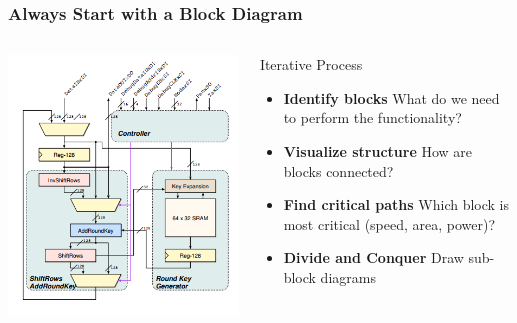 \documentclass[compress]{beamer}
\begin{document}
\begin{frame}
	\frametitle{Always Start with a Block Diagram}
	\begin{columns}
		\begin{center}
			\includegraphics[width= \textwidth]{block_micro_arc}
		\end{center}	
		\begin{block}{Iterative Process}
			\begin{itemize}
				\item \textbf {Identify blocks} \newline
				What do we need to perform the functionality?
				\pause
				\item \textbf {Visualize structure} \newline
				How are blocks connected?
				\pause
				\item \textbf {Find critical paths} \newline
				Which block is most critical (speed, area, power)?
				\pause
				\item \textbf {Divide and Conquer} \newline
				Draw sub-block diagrams
			\end{itemize}
		\end{block}
	\end{columns}
\end{frame}
\end{document}
